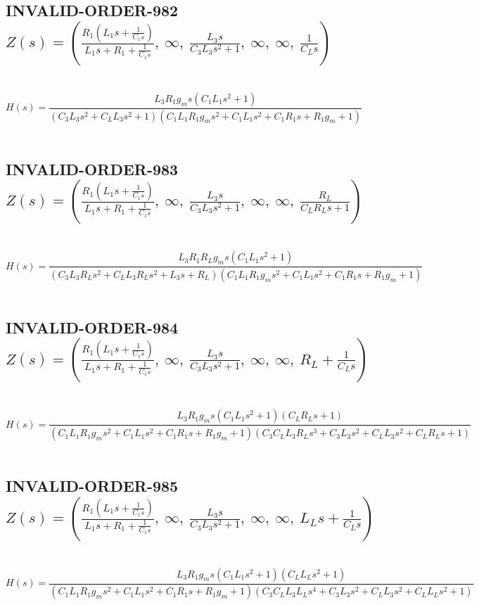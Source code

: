 \documentclass{article}
\begin{document}
\subsection{INVALID-ORDER-982 $Z(s) = \left( \frac{R_{1} \left(L_{1} s + \frac{1}{C_{1} s}\right)}{L_{1} s + R_{1} + \frac{1}{C_{1} s}}, \  \infty, \  \frac{L_{3} s}{C_{3} L_{3} s^{2} + 1}, \  \infty, \  \infty, \  \frac{1}{C_{L} s}\right)$ } \ 
\textbf{\[H(s) = \frac{L_{3} R_{1} g_{m} s \left(C_{1} L_{1} s^{2} + 1\right)}{\left(C_{3} L_{3} s^{2} + C_{L} L_{3} s^{2} + 1\right) \left(C_{1} L_{1} R_{1} g_{m} s^{2} + C_{1} L_{1} s^{2} + C_{1} R_{1} s + R_{1} g_{m} + 1\right)}\] } \ 
\subsection{INVALID-ORDER-983 $Z(s) = \left( \frac{R_{1} \left(L_{1} s + \frac{1}{C_{1} s}\right)}{L_{1} s + R_{1} + \frac{1}{C_{1} s}}, \  \infty, \  \frac{L_{3} s}{C_{3} L_{3} s^{2} + 1}, \  \infty, \  \infty, \  \frac{R_{L}}{C_{L} R_{L} s + 1}\right)$ } \ 
\textbf{\[H(s) = \frac{L_{3} R_{1} R_{L} g_{m} s \left(C_{1} L_{1} s^{2} + 1\right)}{\left(C_{3} L_{3} R_{L} s^{2} + C_{L} L_{3} R_{L} s^{2} + L_{3} s + R_{L}\right) \left(C_{1} L_{1} R_{1} g_{m} s^{2} + C_{1} L_{1} s^{2} + C_{1} R_{1} s + R_{1} g_{m} + 1\right)}\] } \ 
\subsection{INVALID-ORDER-984 $Z(s) = \left( \frac{R_{1} \left(L_{1} s + \frac{1}{C_{1} s}\right)}{L_{1} s + R_{1} + \frac{1}{C_{1} s}}, \  \infty, \  \frac{L_{3} s}{C_{3} L_{3} s^{2} + 1}, \  \infty, \  \infty, \  R_{L} + \frac{1}{C_{L} s}\right)$ } \ 
\textbf{\[H(s) = \frac{L_{3} R_{1} g_{m} s \left(C_{1} L_{1} s^{2} + 1\right) \left(C_{L} R_{L} s + 1\right)}{\left(C_{1} L_{1} R_{1} g_{m} s^{2} + C_{1} L_{1} s^{2} + C_{1} R_{1} s + R_{1} g_{m} + 1\right) \left(C_{3} C_{L} L_{3} R_{L} s^{3} + C_{3} L_{3} s^{2} + C_{L} L_{3} s^{2} + C_{L} R_{L} s + 1\right)}\] } \ 
\subsection{INVALID-ORDER-985 $Z(s) = \left( \frac{R_{1} \left(L_{1} s + \frac{1}{C_{1} s}\right)}{L_{1} s + R_{1} + \frac{1}{C_{1} s}}, \  \infty, \  \frac{L_{3} s}{C_{3} L_{3} s^{2} + 1}, \  \infty, \  \infty, \  L_{L} s + \frac{1}{C_{L} s}\right)$ } \ 
\textbf{\[H(s) = \frac{L_{3} R_{1} g_{m} s \left(C_{1} L_{1} s^{2} + 1\right) \left(C_{L} L_{L} s^{2} + 1\right)}{\left(C_{1} L_{1} R_{1} g_{m} s^{2} + C_{1} L_{1} s^{2} + C_{1} R_{1} s + R_{1} g_{m} + 1\right) \left(C_{3} C_{L} L_{3} L_{L} s^{4} + C_{3} L_{3} s^{2} + C_{L} L_{3} s^{2} + C_{L} L_{L} s^{2} + 1\right)}\] } \ 
\end{document}
